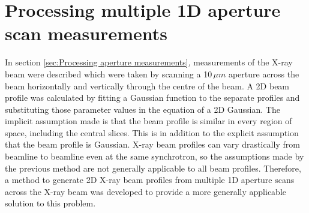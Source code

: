 \section{Processing multiple 1D aperture scan measurements}
\label{sec:Processing multiple 1D aperture scan measurements}
In section \ref{sec:Processing aperture measurements}, measurements of the X-ray beam were described which were taken by scanning a 10$\,\mu m$ aperture across the beam horizontally and vertically through the centre of the beam.
A 2D beam profile was calculated by fitting a Gaussian function to the separate profiles and substituting those parameter values in the equation of a 2D Gaussian.
The implicit assumption made is that the beam profile is similar in every region of space, including the central slices.
This is in addition to the explicit assumption that the beam profile is Gaussian.
X-ray beam profiles can vary drastically from beamline to beamline even at the same synchrotron, so the assumptions made by the previous method are not generally applicable to all beam profiles.
Therefore, a method to generate 2D X-ray beam profiles from multiple 1D aperture scans across the X-ray beam was developed to provide a more generally applicable solution to this problem.

